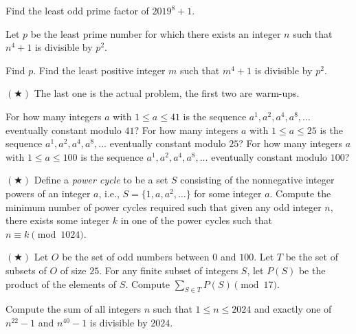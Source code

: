 \documentclass[11pt]{scrartcl}
\begin{document}
\begin{exercise}[AIME I 2019/14]
	Find the least odd prime factor of $2019^8 + 1$. %
\end{exercise}

\begin{exercise}[AIME I 2024/13]
	Let $p$ be the least prime number for which there exists an integer $n$ such that $n^4 + 1$ is divisible by $p^2$.
	\begin{itemize}
		\ii Find $p$. %
		\ii Find the least positive integer $m$ such that $m^4 + 1$ is divisible by $p^2$. %
	\end{itemize}
\end{exercise}

\begin{exercise} $(\bigstar)$
	The last one is the actual problem, the first two are warm-ups.
	\begin{itemize}
		\ii For how many integers $a$ with $1 \le a \le 41$ is the sequence $a^1,a^2,a^4,a^8,\dots$ eventually constant modulo $41$? %
		\ii For how many integers $a$ with $1 \le a \le 25$ is the sequence $a^1,a^2,a^4,a^8,\dots$ eventually constant modulo $25$? %
		\ii For how many integers $a$ with $1 \le a \le 100$ is the sequence $a^1,a^2,a^4,a^8,\dots$ eventually constant modulo $100$? %
	\end{itemize}
\end{exercise}

\begin{exercise}\label{exe:guts_2015_easy} $(\bigstar)$
	Define a \emph{power cycle} to be a set $S$ consisting of the nonnegative integer powers of an integer $a$, i.e., $S = \{1,a,a^2,\dots\}$ for some integer $a$. Compute the minimum number of power cycles required such that given any odd integer $n$, there exists some integer $k$ in one of the power cycles such that $n \equiv k \pmod{1024}$. %
\end{exercise}

\begin{exercise}[Prize 2022/17] $(\bigstar)$
	Let $O$ be the set of odd numbers between $0$ and $100$. Let $T$ be the set of subsets of $O$ of size $25$. For any finite subset of integers $S$, let $P(S)$ be the product of the elements of $S$. Compute $\sum_{S \in T}P(S) \pmod{17}$. %
\end{exercise}

\begin{exercise}
	Compute the sum of all integers $n$ such that $1 \le n \le 2024$ and exactly one of $n^{22} - 1$ and $n^{40} - 1$ is divisible by $2024$. %
\end{exercise}
\end{document}
